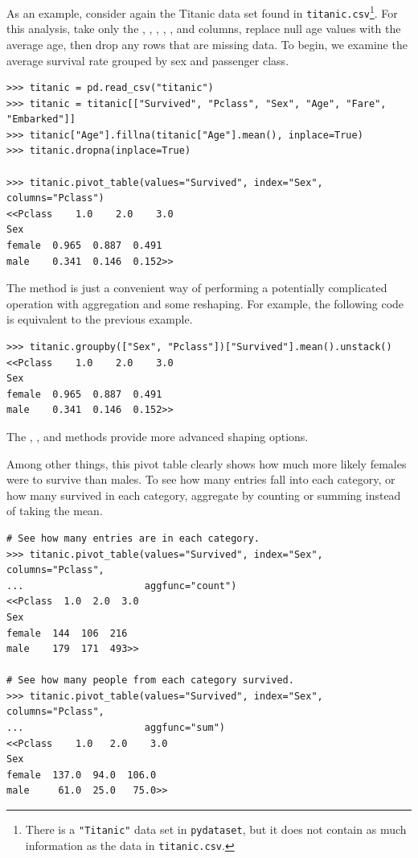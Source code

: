 As an example, consider again the Titanic data set found in \texttt{titanic.csv}\footnote{There is a \texttt{"Titanic"} data set in \texttt{pydataset}, but it does not contain as much information as the data in \texttt{titanic.csv}.}.
For this analysis, take only the , , , , , and  columns, replace null age values with the average age, then drop any rows that are missing data.
To begin, we examine the average survival rate grouped by sex and passenger class.

\begin{lstlisting}
>>> titanic = pd.read_csv("titanic")
>>> titanic = titanic[["Survived", "Pclass", "Sex", "Age", "Fare", "Embarked"]]
>>> titanic["Age"].fillna(titanic["Age"].mean(), inplace=True)
>>> titanic.dropna(inplace=True)

>>> titanic.pivot_table(values="Survived", index="Sex", columns="Pclass")
<<Pclass    1.0    2.0    3.0
Sex
female  0.965  0.887  0.491
male    0.341  0.146  0.152>>
\end{lstlisting}

\begin{info} %
The  method is just a convenient way of performing a potentially complicated  operation with aggregation and some reshaping.
For example, the following code is equivalent to the previous example.

\begin{lstlisting}
>>> titanic.groupby(["Sex", "Pclass"])["Survived"].mean().unstack()
<<Pclass    1.0    2.0    3.0
Sex
female  0.965  0.887  0.491
male    0.341  0.146  0.152>>
\end{lstlisting}

The , , and  methods provide more advanced shaping options.
\end{info}

Among other things, this pivot table clearly shows how much more likely females were to survive than males.
To see how many entries fall into each category, or how many survived in each category, aggregate by counting or summing instead of taking the mean.

\begin{lstlisting}
# See how many entries are in each category.
>>> titanic.pivot_table(values="Survived", index="Sex", columns="Pclass",
...                     aggfunc="count")
<<Pclass  1.0  2.0  3.0
Sex
female  144  106  216
male    179  171  493>>

# See how many people from each category survived.
>>> titanic.pivot_table(values="Survived", index="Sex", columns="Pclass",
...                     aggfunc="sum")
<<Pclass    1.0   2.0    3.0
Sex
female  137.0  94.0  106.0
male     61.0  25.0   75.0>>
\end{lstlisting}

